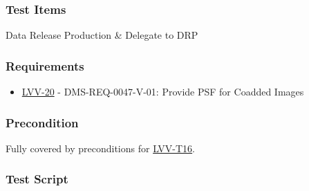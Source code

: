 \hypertarget{test-items-38}{%
\subsubsection{Test Items}\label{test-items-38}}

Data Release Production \& Delegate to DRP

\hypertarget{requirements-39}{%
\subsubsection{Requirements}\label{requirements-39}}

\begin{itemize}
\tightlist
\item
  \href{https://jira.lsstcorp.org/browse/LVV-20}{LVV-20} -
  DMS-REQ-0047-V-01: Provide PSF for Coadded Images
\end{itemize}

\hypertarget{precondition-2}{%
\subsubsection{Precondition}\label{precondition-2}}

Fully covered by preconditions for
\href{https://jira.lsstcorp.org/secure/Tests.jspa\#/testCase/LVV-T16}{LVV-T16}.

\hypertarget{test-script-39}{%
\subsubsection{Test Script}\label{test-script-39}}


